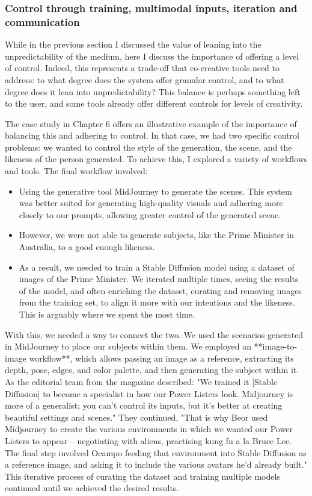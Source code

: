 \subsubsection{Control through training, multimodal inputs, iteration and communication}

While in the previous section I discussed the value of leaning into the unpredictability of the medium, here I discuss the importance of offering a level of control. Indeed, this represents a trade-off that co-creative tools need to address: to what degree does the system offer granular control, and to what degree does it lean into unpredictability? This balance is perhaps something left to the user, and some tools already offer different controls for levels of creativity.

The case study in Chapter 6 offers an illustrative example of the importance of balancing this and adhering to control. In that case, we had two specific control problems: we wanted to control the style of the generation, the scene, and the likeness of the person generated. To achieve this, I explored a variety of workflows and tools. The final workflow involved:
\begin{itemize}
    \item Using the generative tool MidJourney to generate the scenes. This system was better suited for generating high-quality visuals and adhering more closely to our prompts, allowing greater control of the generated scene.
    \item However, we were not able to generate subjects, like the Prime Minister in Australia, to a good enough likeness.
    \item As a result, we needed to train a Stable Diffusion model using a dataset of images of the Prime Minister. We iterated multiple times, seeing the results of the model, and often enriching the dataset, curating and removing images from the training set, to align it more with our intentions and the likeness. This is arguably where we spent the most time.
\end{itemize}
With this, we needed a way to connect the two. We used the scenarios generated in MidJourney to place our subjects within them. We employed an **image-to-image workflow**, which allows passing an image as a reference, extracting its depth, pose, edges, and color palette, and then generating the subject within it. As the editorial team from the magazine described: "We trained it [Stable Diffusion] to become a specialist in how our Power Listers look. Midjourney is more of a generalist; you can’t control its inputs, but it’s better at creating beautiful settings and scenes." They continued, "That is why Beor used Midjourney to create the various environments in which we wanted our Power Listers to appear – negotiating with aliens, practising kung fu a la Bruce Lee. The final step involved Ocampo feeding that environment into Stable Diffusion as a reference image, and asking it to include the various avatars he’d already built." This iterative process of curating the dataset and training multiple models continued until we achieved the desired results.

